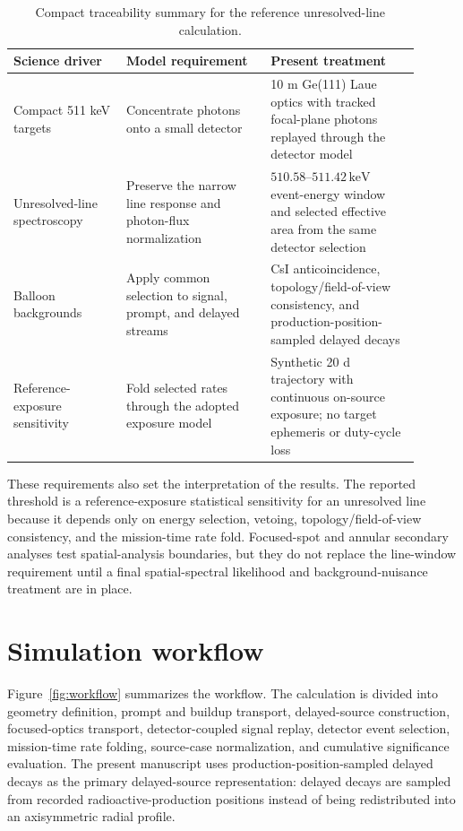 \documentclass[preprint,12pt]{elsarticle}
\newcommand{\keV}{\,\mathrm{keV}}
\begin{document}
\begin{table}[t]
\centering
\caption{Compact traceability summary for the reference unresolved-line calculation.}
\label{tab:requirements_traceability}
\footnotesize
\begin{tabular}{@{}p{0.25\linewidth}p{0.32\linewidth}p{0.33\linewidth}@{}}
\toprule
Science driver & Model requirement & Present treatment \\
\midrule
Compact 511 keV targets & Concentrate photons onto a small detector & 10 m Ge(111) Laue optics with tracked focal-plane photons replayed through the detector model \\
Unresolved-line spectroscopy & Preserve the narrow line response and photon-flux normalization & $510.58$--$511.42\keV$ event-energy window and selected effective area from the same detector selection \\
Balloon backgrounds & Apply common selection to signal, prompt, and delayed streams & CsI anticoincidence, topology/field-of-view consistency, and production-position-sampled delayed decays \\
Reference-exposure sensitivity & Fold selected rates through the adopted exposure model & Synthetic 20 d trajectory with continuous on-source exposure; no target ephemeris or duty-cycle loss \\
\bottomrule
\end{tabular}
\end{table}

These requirements also set the interpretation of the results. The reported threshold is a reference-exposure statistical sensitivity for an unresolved line because it depends only on energy selection, vetoing, topology/field-of-view consistency, and the mission-time rate fold. Focused-spot and annular secondary analyses test spatial-analysis boundaries, but they do not replace the line-window requirement until a final spatial-spectral likelihood and background-nuisance treatment are in place.

\section{Simulation workflow}
\label{sec:workflow}

Figure~\ref{fig:workflow} summarizes the workflow. The calculation is divided into geometry definition, prompt and buildup transport, delayed-source construction, focused-optics transport, detector-coupled signal replay, detector event selection, mission-time rate folding, source-case normalization, and cumulative significance evaluation. The present manuscript uses production-position-sampled delayed decays as the primary delayed-source representation: delayed decays are sampled from recorded radioactive-production positions instead of being redistributed into an axisymmetric radial profile.
\end{document}
